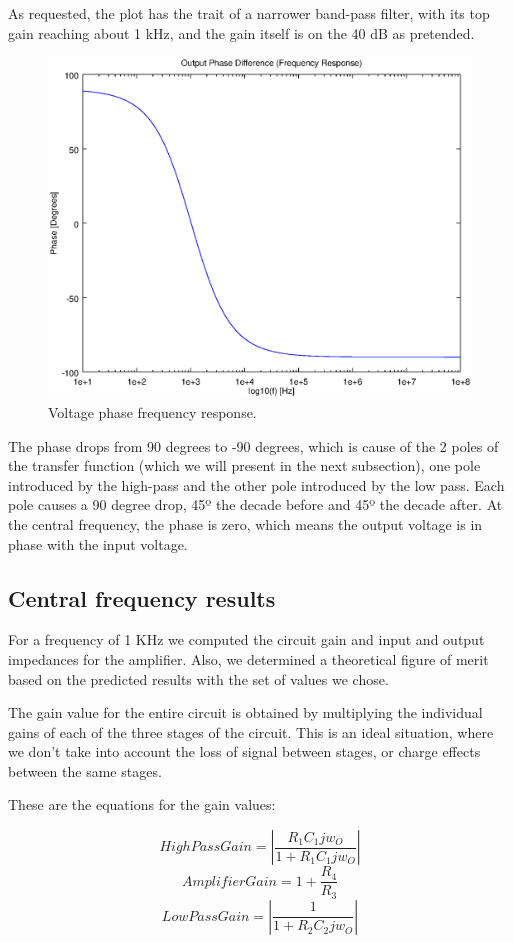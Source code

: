 As requested, the plot has the trait of a narrower band-pass filter, with its top gain reaching about 1 kHz, and the gain itself is on the 40 dB as pretended.

\begin{figure}[h!] \centering
\includegraphics[width=0.6\linewidth]{phase.eps}
\caption{Voltage phase frequency response.}
\label{fig:gainfreq}
\end{figure}

The phase drops from 90 degrees to -90 degrees, which is cause of the 2 poles of the transfer function (which we will present in the next subsection), one pole introduced by the high-pass and the 
other pole introduced by the low pass. Each pole causes a 90 degree drop, 45º the decade before and 45º the decade after. At the central frequency, the phase is zero, which means the output 
voltage is in phase with the input voltage.

\subsection{Central frequency results}
For a frequency of 1 KHz we computed the circuit gain and input and output impedances for the amplifier. Also, we determined a theoretical figure of merit based on the predicted results with the set 
of values we chose.

The gain value for the entire circuit is obtained by multiplying the individual gains of each of the three stages of the circuit. This is an ideal situation, 
where we don't take into account the loss of signal between stages, or charge effects between the same stages.

These are the equations for the gain values:

\begin{equation}
High Pass Gain=|\frac{R_{1}C_{1}jw_{O}}{1+R_{1}C_{1}jw_{O}}|
\end{equation}
\begin{equation}
Amplifier Gain=1+\frac{R_{4}}{R_{3}}
\end{equation}
\begin{equation}
Low Pass Gain=|\frac{1}{1+R_{2}C_{2}jw_{O}}|
\end{equation}

